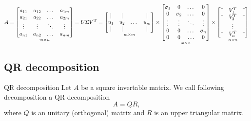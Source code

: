 \[
    A = 
    \underset{m \times n}{
        \begin{bmatrix}
            a_{11} & a_{12} & \dots & a_{1m} \\
            a_{21} & a_{22} & \dots & a_{2m} \\
            \vdots & \vdots & \ddots & \vdots \\
            a_{n1} & a_{n2} & \dots & a_{nm}
        \end{bmatrix}
    }
    = U\Sigma V^\text{T} = 
    \underset{m \times m}{
        \begin{bmatrix}
            | & | & \ & | \\
            u_{1} & u_{2} & \dots & u_{m} \\
            | & | & \ & |
        \end{bmatrix}
    }
    \times
    \underset{m \times n}{
    \begin{bmatrix}
    \sigma_{1} & 0 & \dots & 0 \\
    0 & \sigma_{2} & \dots & 0 \\
    \vdots & \vdots & \ddots & \vdots \\
    0 & 0 & \dots & \sigma_{n} \\
    0 & 0 & \ldots & 0 \\
    \end{bmatrix}}
    \times
    \underset{n \times n}{
        \begin{bmatrix}
            \textemdash & V_{1}^T & \textemdash  \\
            \textemdash & V_{2}^T & \textemdash \\
            \ & \vdots &  \ \\
            \textemdash & V_{n}^T & \textemdash \\
        \end{bmatrix}
    }    
\]

\newpage
\subsection*{QR decomposition}
\begin{definition}{QR decomposition}{}
    Let $A$ be a square invertable matrix. We call following decomposition a QR decomposition
    $$
        A=QR,
    $$
    where $Q$ is an unitary (orthogonal) matrix and $R$ is an upper triangular matrix. 
\end{definition}


